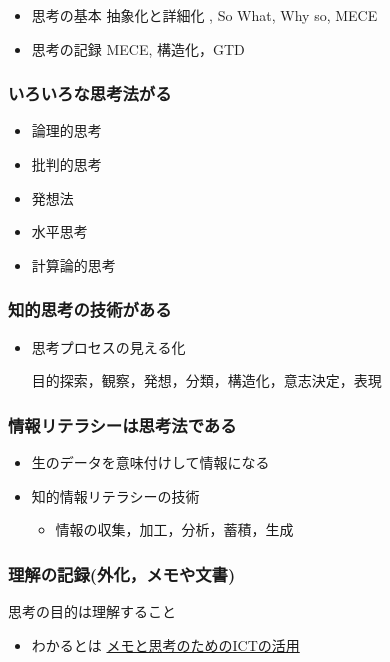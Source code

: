 \documentclass[dvipdfmx,11pat]{jarticle}
\begin{document}
\begin{itemize}
\item 思考の基本 抽象化と詳細化 , So What, Why so, MECE
\item 思考の記録 MECE, 構造化，GTD
\end{itemize}
\subsubsection{いろいろな思考法がる}
\label{sec:orgf815f95}

\begin{itemize}
\item 論理的思考
\item 批判的思考
\item 発想法
\item 水平思考
\item 計算論的思考
\end{itemize}
\subsubsection{知的思考の技術がある}
\label{sec:org9cde7bc}
\begin{itemize}
\item 思考プロセスの見える化

目的探索，観察，発想，分類，構造化，意志決定，表現
\end{itemize}
\subsubsection{情報リテラシーは思考法である}
\label{sec:orgf319902}
\begin{itemize}
\item 生のデータを意味付けして情報になる
\item 知的情報リテラシーの技術
\begin{itemize}
\item 情報の収集，加工，分析，蓄積，生成
\end{itemize}
\end{itemize}
\subsubsection{理解の記録(外化，メモや文書)}
\label{sec:orgaa9fa78}
思考の目的は理解すること
\begin{itemize}
\item わかるとは \href{https://masayuki054.github.io/ict\_literacy\_for\_thinking\_and\_memo/\#outline-container-orgeb1c772}{メモと思考のためのICTの活用}
\end{itemize}
\end{document}
